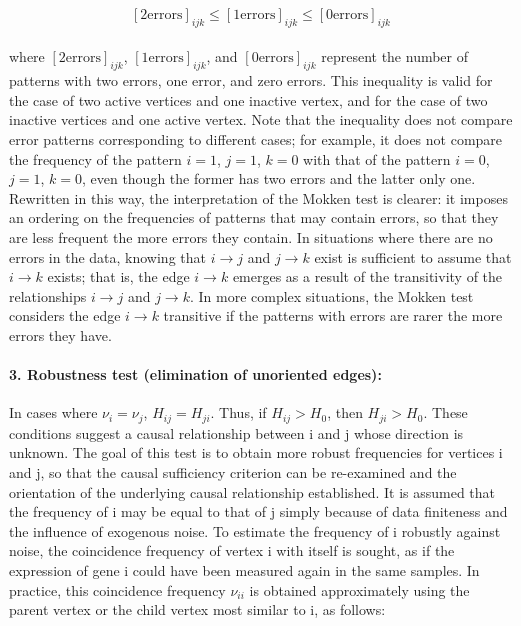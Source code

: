 \documentclass[12pt,a4paper]{report}
\begin{document}
 \begin{equation}
 \label{eq:errores}
 [2 \mathrm{errors}]_{ijk} \leq [1 \mathrm{errors}]_{ijk} \leq [0 \mathrm{errors}]_{ijk}
 \end{equation}
\\
where $[2 \mathrm{errors}]_{ijk}$, $[1 \mathrm{errors}]_{ijk}$, and $[0 \mathrm{errors}]_{ijk}$ represent the number of patterns with two errors, one error, and zero errors. This inequality is valid for the case of two active vertices and one inactive vertex, and for the case of two inactive vertices and one active vertex. Note that the inequality does not compare error patterns corresponding to different cases; for example, it does not compare the frequency of the pattern $i = 1$, $j = 1$, $k = 0$ with that of the pattern $i = 0$, $j = 1$, $k = 0$, even though the former has two errors and the latter only one. Rewritten in this way, the interpretation of the Mokken test is clearer: it imposes an ordering on the frequencies of patterns that may contain errors, so that they are less frequent the more errors they contain. In situations where there are no errors in the data, knowing that $i \to j$ and $j \to k$ exist is sufficient to assume that $i \to k$ exists; that is, the edge $i \to k$ emerges as a result of the transitivity of the relationships $i \to j$ and $j \to k$. In more complex situations, the Mokken test considers the edge $i \to k$ transitive if the patterns with errors are rarer the more errors they have. 

\paragraph{3. Robustness test (elimination of unoriented edges):}
In cases where $\nu_i = \nu_j$, $H_{ij} = H_{ji}$. Thus, if $H_{ij} > H_0$, then $H_{ji} > H_0$. These conditions suggest a causal relationship between i and j whose direction is unknown. The goal of this test is to obtain more robust frequencies for vertices i and j, so that the causal sufficiency criterion can be re-examined and the orientation of the underlying causal relationship established. It is assumed that the frequency of i may be equal to that of j simply because of data finiteness and the influence of exogenous noise. To estimate the frequency of i robustly against noise, the coincidence frequency of vertex i with itself is sought, as if the expression of gene i could have been measured again in the same samples. In practice, this coincidence frequency $\nu_{ii}$ is obtained approximately using the parent vertex or the child vertex most similar to i, as follows:
\end{document}
